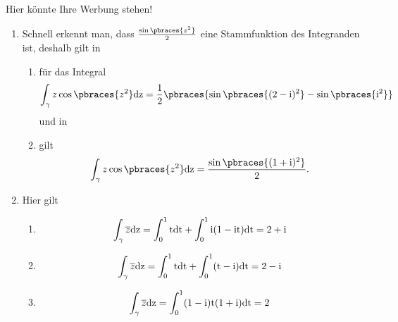 \begin{solution}
    Hier könnte Ihre Werbung stehen!
    \begin{enumerate}[label = (\roman*)]
        \item Schnell erkennt man, dass $\frac{\sin\pbraces{z^2}}{2}$ eine Stammfunktion des Integranden ist, deshalb gilt in
        \begin{enumerate}[label = (\arabic*)]
            \item für das Integral
            \begin{align*}
                \int_\gamma z \cos\pbraces{z^2} \rm{d}z = \frac{1}{2}\pbraces{\sin\pbraces{(2 - \rm{i})^2} - \sin\pbraces{i^2}}
            \end{align*}
            und in 
            \item gilt
            \begin{align*}
                \int_\gamma z \cos\pbraces{z^2} \rm{d}z = \frac{\sin\pbraces{(1 + i)^2}}{2}.
            \end{align*}
        \end{enumerate}
        \item Hier gilt
        \begin{enumerate}[label = (\alph*)]
            \item 
            \begin{align*}
                \int_\gamma \overline{z} \rm{d}z = \int_0^1 t \rm{d}t +  \int_0^1 \rm{i}(1 - \rm{i}t) \rm{d}t = 2 + \rm{i}
            \end{align*}
            \item 
            \begin{align*}
                \int_\gamma \overline{z} \rm{d}z = \int_0^1 t \rm{d}t + \int_0^1 (t - \rm{i}) \rm{d}t = 2 - \rm{i}
            \end{align*}
            \item 
            \begin{align*}
                \int_\gamma \overline{z} \rm{d}z = \int_0^1 (1 - \rm{i})t(1 + \rm{i}) \rm{d}t = 2
            \end{align*}
        \end{enumerate}
    \end{enumerate}
    
\end{solution}